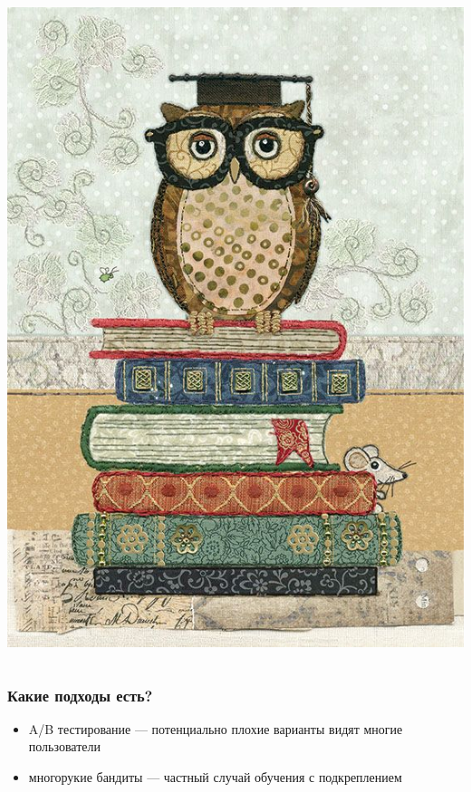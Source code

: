 \documentclass[fullscreen=true, bookmarks=true, hyperref={pdfencoding=unicode}]{beamer}
\begin{document}
\begin{frame}
\begin{columns}
\begin{column}{.5\paperwidth}
\begin{center}
          \includegraphics[keepaspectratio,
                           height=.5\paperwidth]{hi-2.jpg}
        \end{center}
      \end{column}
  \end{columns}

\end{frame}


\begin{frame}
  \frametitle{Какие подходы есть?}

  \begin{itemize}
    \item A/B тестирование — потенциально плохие варианты видят многие пользователи
    \item многорукие бандиты — частный случай обучения с подкреплением
  \end{itemize}
\end{frame}
\end{document}
